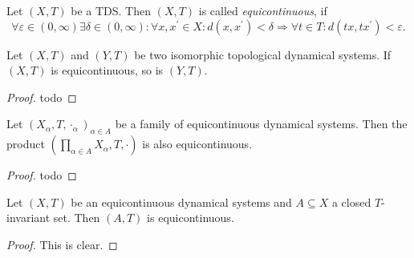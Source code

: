 \begin{definition}
	Let $(X,T)$ be a TDS. Then $(X,T)$ is called \emph{equicontinuous}, if
	\begin{equation*}
		\forall \varepsilon \in (0, \infty) \exists \delta \in (0, \infty): \forall x , x^\prime \in X :  d(x, x^\prime) < \delta  \Rightarrow \forall t \in T: d(tx, tx^\prime) < \varepsilon.
	\end{equation*}
\end{definition}

\begin{proposition}
	Let $(X, T)$ and $(Y, T)$ be two isomorphic topological dynamical systems. If $(X, T)$ is equicontinuous, so is $(Y, T)$.
\end{proposition}
\begin{proof}
	todo
\end{proof}

\begin{proposition}
	Let $(X_\alpha, T, \cdot_\alpha)_{\alpha \in A}$ be a family of equicontinuous dynamical systems. Then the product $(\prod_{\alpha \in A} X_\alpha, T, \cdot)$ is also equicontinuous.
\end{proposition}
\begin{proof}
	todo
\end{proof}

\begin{proposition}
	Let $(X, T)$ be an equicontinuous dynamical systems and $A \subseteq X$ a closed $T$-invariant set. Then $(A, T)$ is equicontinuous.
\end{proposition}
\begin{proof}
	This is clear.
\end{proof}